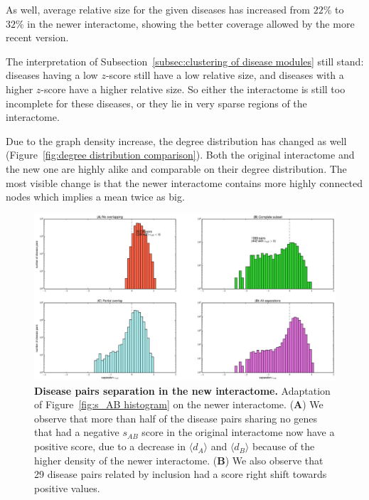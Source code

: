 \documentclass[letterpaper]{article}
\begin{document}
	As well, average relative size for the given diseases has increased from $22\%$ to $32\%$ in the newer interactome,
	showing the better coverage allowed by the more recent version.

	The interpretation of Subsection~\ref{subsec:clustering of disease modules} still stand: diseases having a low $z$-score still
	have a low relative size, and diseases with a higher $z$-score have a higher relative size. So either the interactome is still
	too incomplete for these diseases, or they lie in very sparse regions of the interactome.

	Due to the graph density increase, the degree distribution has changed as well (Figure~\ref{fig:degree distribution comparison}).
	Both the original interactome and the new one are highly alike and comparable on their degree distribution. The most
	visible change is that the newer interactome contains more highly connected nodes which implies a mean twice as big.

	\begin{figure}[!t]
		\hspace{-1.8cm}
		\vspace{-1cm}
		\includegraphics[scale=.35]{images/new_interactome_s_AB_histogram.eps}
		\caption{{\bf Disease pairs separation in the new interactome.} Adaptation of Figure~\ref{fig:s_AB histogram} on the
		newer interactome.
		({\bf A}) We observe that more than half of the disease pairs sharing no genes that had a negative $s_{AB}$ score
		in the original interactome now have a positive score, due to a decrease in $\langle d_A \rangle$ and $\langle d_B \rangle$
		because of the higher density of the newer interactome. ({\bf B}) We also observe that 29 disease pairs related by inclusion
		had a score right shift towards positive values.
		\label{fig:new interactome s_AB}}
	\end{figure}
\end{document}
